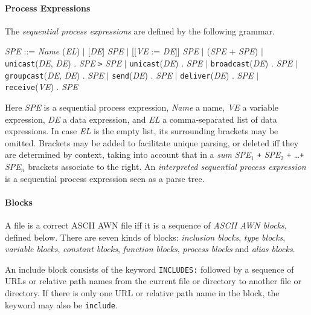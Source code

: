 \documentclass[adraft]{eptcs}
\newcommand{\aac}[1]{{\tt #1}}    %
\begin{document}
\paragraph{Process Expressions}
The \emph{sequential process expressions} are defined by the following grammar.
\begin{center}
\textit{SPE} ::= \textit{Name} (\textit{EL}) $|$ [\textit{DE}] \textit{SPE} $|$ [[\textit{VE} := \textit{DE}]] \textit{SPE} $|$
(\textit{SPE} + \textit{SPE}) $|$ \\
\aac{unicast}(\textit{DE}, \textit{DE}) . \textit{SPE} {\tt >} \textit{SPE} $|$
\aac{unicast}(\textit{DE}) . \textit{SPE} $|$
\aac{broadcast}(\textit{DE}) . \textit{SPE} $|$ \\
\aac{groupcast}(\textit{DE}, \textit{DE}) . \textit{SPE} $|$
\aac{send}(\textit{DE}) . \textit{SPE} $|$
\aac{deliver}(\textit{DE}) . \textit{SPE} $|$
\aac{receive}(\textit{VE}) . \textit{SPE}
\end{center}
Here \textit{SPE} is a sequential process expression, \textit{Name} a name, \textit{VE} a variable expression,
\textit{DE} a data expression,
and \textit{EL} a comma-separated list of data expressions. In case \textit{EL} is the empty list,
its surrounding brackets may be omitted.
Brackets may be added to facilitate unique parsing, or deleted iff they are determined by context,
taking into account that in a \emph{sum}
\textit{SPE}$_1$ {\tt +} \textit{SPE}$_2$ {\tt +} \dots {\tt +} \textit{SPE}$_n$
brackets associate to the right.
An \emph{interpreted sequential process expression} is a sequential process expression seen as a parse tree. 

\paragraph{Blocks}
A file is a correct ASCII AWN file iff it is a sequence of \emph{ASCII AWN blocks}, defined below.
There are seven kinds of blocks:
\emph{inclusion blocks},
\emph{type blocks},
\emph{variable blocks},
\emph{constant blocks},
\emph{function blocks},
\emph{process blocks} and
\emph{alias blocks}.

An include block consists of the keyword {\tt INCLUDES:} followed by a sequence of URLs or relative
path names from the current file or directory to another file or directory.
If there is only one URL or relative path name in the block, the keyword may also be {\tt include}.
\end{document}
